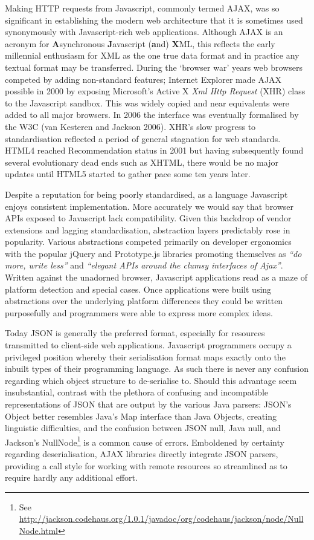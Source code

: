 \documentclass[12pt, ]{article}
\begin{document}
Making HTTP requests from Javascript, commonly termed AJAX, was so
significant in establishing the modern web architecture that it is
sometimes used synonymously with Javascript-rich web applications.
Although AJAX is an acronym for \textbf{A}synchronous
\textbf{J}avascript (\textbf{a}nd) \textbf{X}ML, this reflects the early
millennial enthusiasm for XML as the one true data format and in
practice any textual format may be transferred. During the `browser war'
years web browsers competed by adding non-standard features; Internet
Explorer made AJAX possible in 2000 by exposing Microsoft's Active X
\emph{Xml Http Request} (XHR) class to the Javascript sandbox. This was
widely copied and near equivalents were added to all major browsers. In
2006 the interface was eventually formalised by the W3C (van Kesteren
and Jackson 2006). XHR's slow progress to standardisation reflected a
period of general stagnation for web standards. HTML4 reached
Recommendation status in 2001 but having subsequently found several
evolutionary dead ends such as XHTML, there would be no major updates
until HTML5 started to gather pace some ten years later.

Despite a reputation for being poorly standardised, as a language
Javascript enjoys consistent implementation. More accurately we would
say that browser APIs exposed to Javascript lack compatibility. Given
this backdrop of vendor extensions and lagging standardisation,
abstraction layers predictably rose in popularity. Various abstractions
competed primarily on developer ergonomics with the popular jQuery and
Prototype.js libraries promoting themselves as \emph{``do more, write
less''} and \emph{``elegant APIs around the clumsy interfaces of
Ajax''}. Written against the unadorned browser, Javascript applications
read as a maze of platform detection and special cases. Once
applications were built using abstractions over the underlying platform
differences they could be written purposefully and programmers were able
to express more complex ideas.

Today JSON is generally the preferred format, especially for resources
transmitted to client-side web applications. Javascript programmers
occupy a privileged position whereby their serialisation format maps
exactly onto the inbuilt types of their programming language. As such
there is never any confusion regarding which object structure to
de-serialise to. Should this advantage seem insubstantial, contrast with
the plethora of confusing and incompatible representations of JSON that
are output by the various Java parsers: JSON's Object better resembles
Java's Map interface than Java Objects, creating linguistic
difficulties, and the confusion between JSON null, Java null, and
Jackson's NullNode\footnote{See
  \url{http://jackson.codehaus.org/1.0.1/javadoc/org/codehaus/jackson/node/NullNode.html}}
is a common cause of errors. Emboldened by certainty regarding
deserialisation, AJAX libraries directly integrate JSON parsers,
providing a call style for working with remote resources so streamlined
as to require hardly any additional effort.
\end{document}
